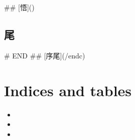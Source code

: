 \documentclass[letterpaper,10pt,english]{sphinxmanual}
\begin{document}
\#\# {[}悟{]}()


\section{尾}
\label{\detokenize{poem/END::doc}}\label{\detokenize{poem/END:id1}}
\# END
\#\# {[}序尾{]}(/endc)


\chapter{Indices and tables}
\label{\detokenize{index:indices-and-tables}}\begin{itemize}
\item {} 

\item {} 

\item {} 

\end{itemize}



\renewcommand{\indexname}{Index}
\printindex
\end{document}
